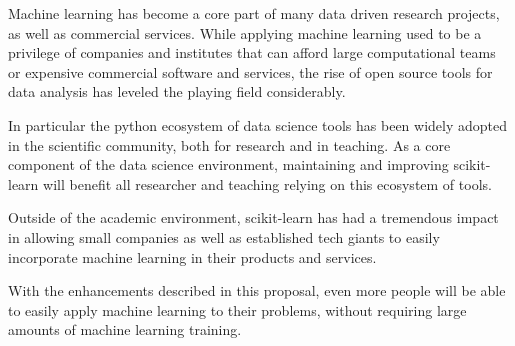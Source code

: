 Machine learning has become a core part of many data driven research projects,
as well as commercial services. While applying machine learning used to be
a privilege of companies and institutes that can afford large computational
teams or expensive commercial software and services, the rise of open
source tools for data analysis has leveled the playing field considerably.

In particular the python ecosystem of data science tools has been widely
adopted in the scientific community, both for research and in teaching.
As a core component of the data science environment, maintaining and
improving scikit-learn will benefit all researcher and teaching relying
on this ecosystem of tools.

Outside of the academic environment, scikit-learn has had a tremendous
impact in allowing small companies as well as established tech giants
to easily incorporate machine learning in their products and services.

With the enhancements described in this proposal, even more people
will be able to easily apply machine learning to their problems,
without requiring large amounts of machine learning training.

